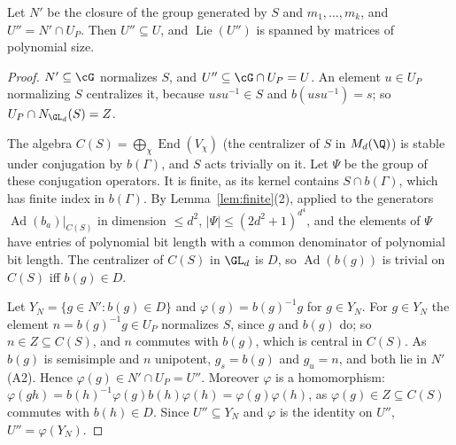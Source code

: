 \begin{lemma}\label{lem:Upp}
Let $N'$ be the closure of the group generated by $S$ and $m_1,\ldots,m_k$, and $U''=N'\cap U_P$.
Then $U''\subseteq U$, and $\operatorname{Lie}(U'')$ is spanned by matrices of polynomial size.
\end{lemma}
\begin{proof}
$N'\subseteq\cG$ normalizes $S$, and $U''\subseteq\cG\cap U_P=U$. An element $u\in U_P$ normalizing $S$
centralizes it, because $usu^{-1}\in S$ and $b(usu^{-1})=s$; so $U_P\cap N_{\GL_d}(S)=Z$.

The algebra $C(S)=\bigoplus_\chi\operatorname{End}(V_\chi)$ (the centralizer of $S$ in $M_d(\Q)$) is stable under
conjugation by $b(\Gamma)$, and $S$ acts trivially on it. Let $\Psi$ be the group of these conjugation
operators. It is finite, as its kernel contains $S\cap b(\Gamma)$, which has finite index in $b(\Gamma)$.
By Lemma~\ref{lem:finite}(2), applied to the generators $\operatorname{Ad}(b_a)|_{C(S)}$ in dimension $\le d^2$,
$|\Psi|\le(2d^2+1)^{d^4}$, and the elements of $\Psi$ have entries of polynomial bit length with a common
denominator of polynomial bit length. The centralizer of $C(S)$ in $\GL_d$ is $D$, so $\operatorname{Ad}(b(g))$ is
trivial on $C(S)$ iff $b(g)\in D$.

Let $Y_N=\{g\in N':b(g)\in D\}$ and $\varphi(g)=b(g)^{-1}g$ for $g\in Y_N$. For $g\in Y_N$ the element
$n=b(g)^{-1}g\in U_P$ normalizes $S$, since $g$ and $b(g)$ do; so $n\in Z\subseteq C(S)$, and $n$ commutes
with $b(g)$, which is central in $C(S)$. As $b(g)$ is semisimple and $n$ unipotent, $g_s=b(g)$ and $g_u=n$,
and both lie in $N'$ (A2). Hence $\varphi(g)\in N'\cap U_P=U''$. Moreover $\varphi$ is a homomorphism:
$\varphi(gh)=b(h)^{-1}\varphi(g)b(h)\varphi(h)=\varphi(g)\varphi(h)$, as $\varphi(g)\in Z\subseteq C(S)$ commutes with
$b(h)\in D$. Since $U''\subseteq Y_N$ and $\varphi$ is the identity on $U''$, $U''=\varphi(Y_N)$.


\end{proof}

